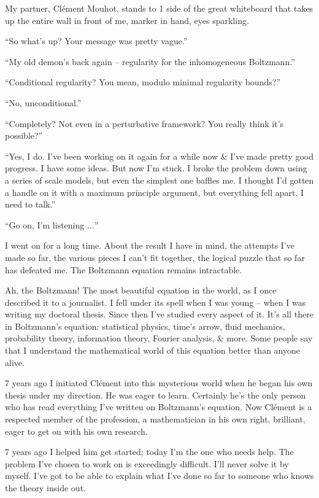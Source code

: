 \documentclass{article}
\numberwithin{equation}{section}
\begin{document}
My partner, Cl\'ement Mouhot, stands to 1 side of the great whiteboard that takes up the entire wall in front of me, marker in hand, eyes sparkling.

``So what's up? Your message was pretty vague.''

``My old demon's back again -- regularity for the inhomogeneous Boltzmann.''

``Conditional regularity? You mean, modulo minimal regularity bounds?''

``No, unconditional.''

``Completely? Not even in a perturbative framework? You really think it's possible?''

``Yes, I do. I've been working on it again for a while now \& I've made pretty good progress. I have some ideas. But now I'm stuck. I broke the problem down using a series of scale models, but even the simplest one baffles me. I thought I'd gotten a handle on it with a maximum principle argument, but everything fell apart. I need to talk.''

``Go on, I'm listening $\ldots$''

I went on for a long time. About the result I have in mind, the attempts I've made so far, the various pieces I can't fit together, the logical puzzle that so far has defeated me. The Boltzmann equation remains intractable.

Ah, the Boltzmann! The most beautiful equation in the world, as I once described it to a journalist. I fell under its spell when I was young -- when I was writing my doctoral thesis. Since then I've studied every aspect of it. It's all there in Boltzmann's equation: statistical physics, time's arrow, fluid mechanics, probability theory, information theory, Fourier analysis, \& more. Some people say that I understand the mathematical world of this equation better than anyone alive.

7 years ago I initiated Cl\'ement into this mysterious world when he began his own thesis under my direction. He was eager to learn. Certainly he's the only person who has read everything I've written on Boltzmann's equation. Now Cl\'ement is a respected member of the profession, a mathematician in his own right, brilliant, eager to get on with his own research.

7 years ago I helped him get started; today I'm the one who needs help. The problem I've chosen to work on is exceedingly difficult. I'll never solve it by myself. I've got to be able to explain what I've done so far to someone who knows the theory inside out.
\end{document}
